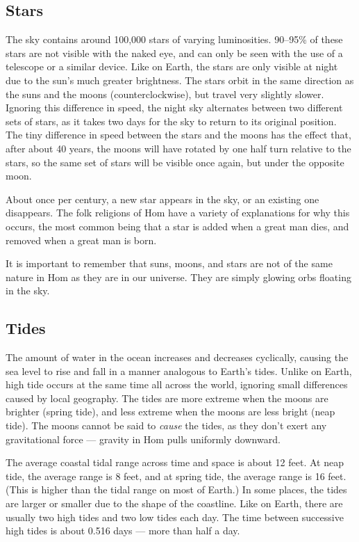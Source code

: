 \documentclass{article}
\begin{document}
\subsection{Stars}

The sky contains around 100,000 stars of varying luminosities. 90--95\% of these stars are not visible with the naked eye, and can only be seen with the use of a telescope or a similar device. Like on Earth, the stars are only visible at night due to the sun's much greater brightness. The stars orbit in the same direction as the suns and the moons (counterclockwise), but travel very slightly slower. Ignoring this difference in speed, the night sky alternates between two different sets of stars, as it takes two days for the sky to return to its original position. The tiny difference in speed between the stars and the moons has the effect that, after about 40 years, the moons will have rotated by one half turn relative to the stars, so the same set of stars will be visible once again, but under the opposite moon.

About once per century, a new star appears in the sky, or an existing one disappears. The folk religions of Hom have a variety of explanations for why this occurs, the most common being that a star is added when a great man dies, and removed when a great man is born.

It is important to remember that suns, moons, and stars are not of the same nature in Hom as they are in our universe. They are simply glowing orbs floating in the sky.

\subsection{Tides}

The amount of water in the ocean increases and decreases cyclically, causing the sea level to rise and fall in a manner analogous to Earth's tides. Unlike on Earth, high tide occurs at the same time all across the world, ignoring small differences caused by local geography. The tides are more extreme when the moons are brighter (spring tide), and less extreme when the moons are less bright (neap tide). The moons cannot be said to \textit{cause} the tides, as they don't exert any gravitational force --- gravity in Hom pulls uniformly downward. 

The average coastal tidal range across time and space is about 12 feet. At neap tide, the average range is 8 feet, and at spring tide, the average range is 16 feet. (This is higher than the tidal range on most of Earth.) In some places, the tides are larger or smaller due to the shape of the coastline. Like on Earth, there are usually two high tides and two low tides each day. The time between successive high tides is about 0.516 days --- more than half a day.
\end{document}
